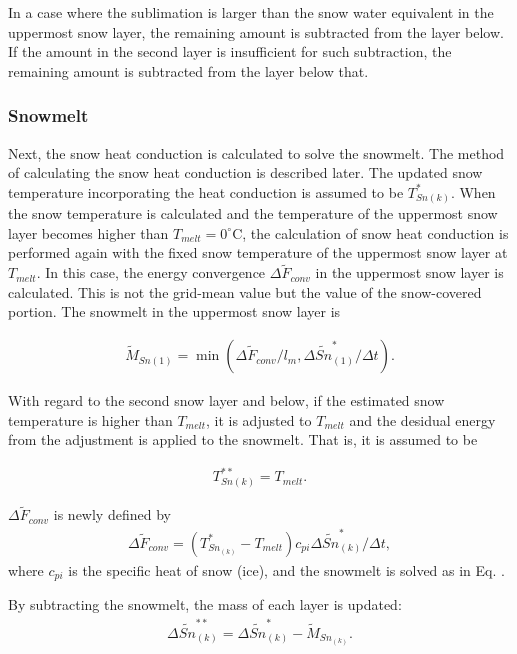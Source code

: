 In a case where the sublimation is larger than the snow water equivalent in the uppermost snow layer, the remaining amount is subtracted from the layer below. If the amount in the second layer is
insufficient for such subtraction, the remaining amount is subtracted from the layer below that.

\subsubsection{Snowmelt}\label{snowmelt}

Next, the snow heat conduction is calculated to solve the snowmelt. The method of calculating the snow heat conduction is described later. The updated snow temperature incorporating the heat
conduction is assumed to be \(T_{Sn(k)}^{\ast}\). When the snow temperature is calculated and the temperature of the uppermost snow layer becomes higher than \(T_{melt} = 0 ^\circ\mathrm{C}\), the
calculation of snow heat conduction is performed again with the fixed snow temperature of the uppermost snow layer at \(T_{melt}\). In this case, the energy convergence \(\Delta \widetilde{F}_{conv}\)
in the uppermost snow layer is calculated. This is not the grid-mean value but the value of the snow-covered portion. The snowmelt in the uppermost snow layer is

\begin{eqnarray}
\widetilde{M}_{Sn(1)} = \min(\Delta \widetilde{F}_{conv} / l_m, \Delta \widetilde{Sn}_{(1)}^{\ast}/\Delta t ). \label{8-12}
\end{eqnarray}

With regard to the second snow layer and below, if the estimated snow temperature is higher than \(T_{melt}\), it is adjusted to \(T_{melt}\) and the desidual energy from the adjustment is applied to
the snowmelt. That is, it is assumed to be

\begin{eqnarray}
T_{Sn(k)}^{\ast\ast} = T_{melt}. \label{8-13}
\end{eqnarray}

\(\Delta \widetilde{F}_{conv}\) is newly defined by \begin{eqnarray}
\Delta \widetilde{F}_{conv} = ( T_{Sn_{(k)}}^{\ast} - T_{melt} ) c_{pi}\Delta\widetilde{Sn}_{(k)}^{\ast}/\Delta t, \label{8-14}
\end{eqnarray} where \(c_{pi}\) is the specific heat of snow (ice), and the snowmelt is solved as in Eq. \hyperref[8-12]{}.

By subtracting the snowmelt, the mass of each layer is updated: \begin{eqnarray}
\Delta\widetilde{Sn}_{(k)}^{\ast\ast} = \Delta\widetilde{Sn}_{(k)}^{\ast} - \widetilde{M}_{Sn_{(k)}}. \label{8-15}
\end{eqnarray}

